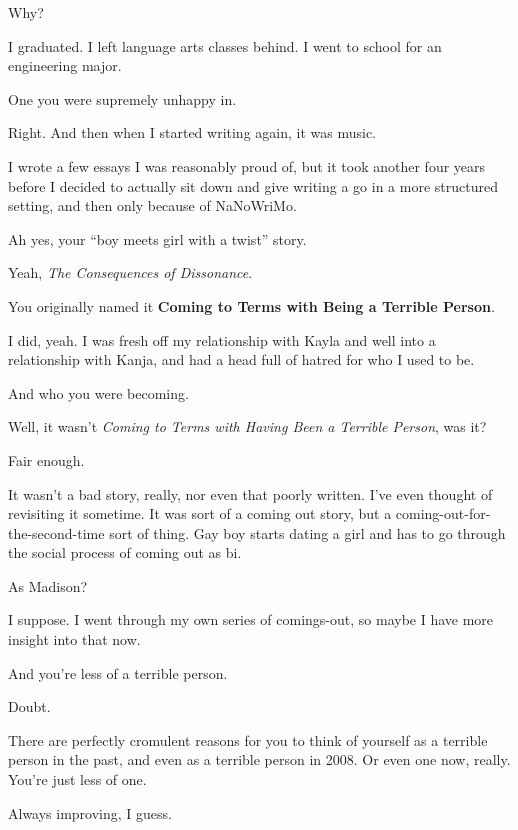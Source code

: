 \begin{leftcolumn}
\begin{ally}
Why?
\end{ally}
I graduated. I left language arts classes behind. I went to school for an engineering major.

\begin{ally}
One you were supremely unhappy in.
\end{ally}
Right. And then when I started writing again, it was music.

I wrote a few essays I was reasonably proud of, but it took another four years before I decided to actually sit down and give writing a go in a more structured setting, and then only because of NaNoWriMo.

\begin{ally}
Ah yes, your ``boy meets girl with a twist'' story.
\end{ally}
Yeah, \emph{The Consequences of Dissonance}.

\begin{ally}
You originally named it \textbf{Coming to Terms with Being a Terrible Person}.
\end{ally}
I did, yeah. I was fresh off my relationship with Kayla and well into a relationship with Kanja, and had a head full of hatred for who I used to be.

\begin{ally}
And who you were becoming.
\end{ally}
Well, it wasn't \emph{Coming to Terms with Having Been a Terrible Person}, was it?

\begin{ally}
Fair enough.
\end{ally}
It wasn't a bad story, really, nor even that poorly written. I've even thought of revisiting it sometime. It was sort of a coming out story, but a coming-out-for-the-second-time sort of thing. Gay boy starts dating a girl and has to go through the social process of coming out as bi.

\begin{ally}
As Madison?
\end{ally}
I suppose. I went through my own series of comings-out, so maybe I have more insight into that now.

\begin{ally}
And you're less of a terrible person.
\end{ally}
Doubt.

\begin{ally}
There are perfectly cromulent reasons for you to think of yourself as a terrible person in the past, and even as a terrible person in 2008. Or even one now, really. You're just less of one.
\end{ally}
Always improving, I guess.


\end{leftcolumn}
